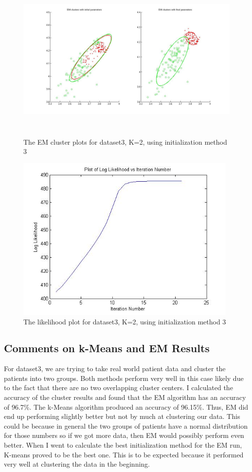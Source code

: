 \documentclass[11pt,psfig]{article}
\begin{document}
\begin{figure}[H]
\centering
\includegraphics[height=3.25in]{dataset3_EMclusterPlots.jpg}
\caption{The EM cluster plots for dataset3, K=2, using initialization method 3}
\end{figure}

\begin{figure}[H]
\centering
\includegraphics[height=3.25in]{dataset3_EMlogLikelihoodPlot.jpg}
\caption{The likelihood plot for dataset3, K=2, using initialization method 3}
\end{figure}

\subsection{Comments on k-Means and EM Results}

For dataset3, we are trying to take real world patient data and cluster the patients into two groups. Both methods perform very well in this case likely due to the fact that there are no two overlapping cluster centers. I calculated the accuracy of the cluster results and found that the EM algorithm has an accuracy of 96.7\%. The k-Means algorithm produced an accuracy of 96.15\%. Thus, EM did end up performing slightly better but not by much at clustering our data. This could be because in general the two groups of patients have a normal distribution for those numbers so if we got more data, then EM would possibly perform even better. When I went to calculate the best initialization method for the EM run, K-means proved to be the best one. This is to be expected because it performed very well at clustering the data in the beginning. 
\end{document}
